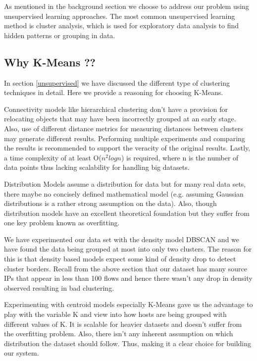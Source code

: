 As mentioned in the background section we choose to address our problem using unsupervised learning approaches. The most common unsupervised learning method is cluster analysis, which is used for exploratory data analysis to find hidden patterns or grouping in data. 

\subsection{Why K-Means ??}
 In section \ref{unsupervised} we have discussed the different type of clustering techniques in detail. Here we provide a reasoning for choosing K-Means.
 
Connectivity models like hierarchical clustering don't have a provision for relocating objects that may have been incorrectly grouped at an early stage. Also, use of different distance metrics for measuring distances between clusters may generate different results. Performing multiple experiments and comparing
the results is recommended to support the veracity of
the original results. Lastly, a time complexity of at least O($n^2logn$) is required, where n is the number of data points thus lacking scalability for handling big datasets.

Distribution Models assume a distribution for data but for many real data sets, there maybe no concisely defined mathematical model (e.g. assuming Gaussian distributions is a rather strong assumption on the data). Also, though distribution models have an excellent  theoretical foundation but they suffer from one key problem known as overfitting. 

We have experimented our data set with the density model DBSCAN and we have found the data being grouped at most into only two clusters. The reason for this is that density based models expect some kind of density drop to detect cluster borders. Recall from the above section that our dataset has many source IPs that appear in less than 100 flows and hence there wasn't any drop in density observed resulting in bad clustering.

Experimenting with centroid models especially K-Means gave us the advantage to play with the variable K and view into how hosts are being grouped with different values of K. It is scalable for heavier datasets and doesn't suffer from the overfitting problem. Also, there isn't any inherent assumption on which distribution the dataset should follow. Thus, making it a clear choice for building our system.


